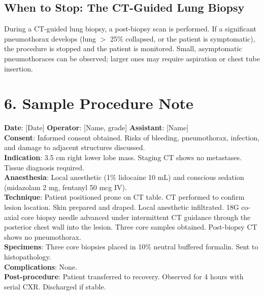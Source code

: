 \subsection{When to Stop: The CT-Guided Lung Biopsy}
During a CT-guided lung biopsy, a post-biopsy scan is performed. If a significant pneumothorax develops (lung $>$ 25\% collapsed, or the patient is symptomatic), the procedure is stopped and the patient is monitored. Small, asymptomatic pneumothoraces can be observed; larger ones may require aspiration or chest tube insertion.

\section{6. Sample Procedure Note}

\begin{testbox}
\textbf{Date}: [Date] \quad \textbf{Operator}: [Name, grade] \quad \textbf{Assistant}: [Name]\\
\textbf{Consent}: Informed consent obtained. Risks of bleeding, pneumothorax, infection, and damage to adjacent structures discussed.\\
\textbf{Indication}: 3.5 cm right lower lobe mass. Staging CT shows no metastases. Tissue diagnosis required.\\
\textbf{Anaesthesia}: Local anesthetic (1\% lidocaine 10 mL) and conscious sedation (midazolam 2 mg, fentanyl 50 mcg IV).\\
\textbf{Technique}: Patient positioned prone on CT table. CT performed to confirm lesion location. Skin prepared and draped. Local anesthetic infiltrated. 18G co-axial core biopsy needle advanced under intermittent CT guidance through the posterior chest wall into the lesion. Three core samples obtained. Post-biopsy CT shows no pneumothorax.\\
\textbf{Specimens}: Three core biopsies placed in 10\% neutral buffered formalin. Sent to histopathology.\\
\textbf{Complications}: None.\\
\textbf{Post-procedure}: Patient transferred to recovery. Observed for 4 hours with serial CXR. Discharged if stable.
\end{testbox}

\clearpage
